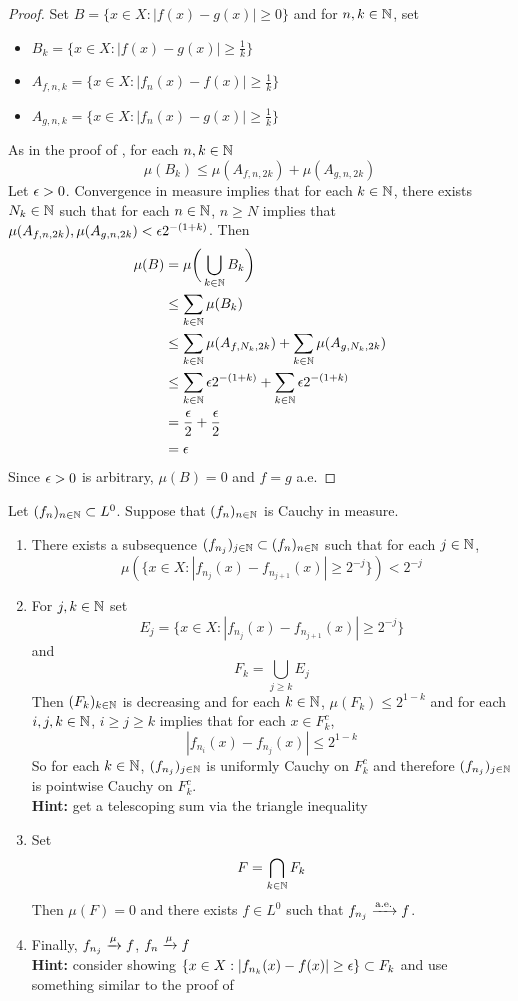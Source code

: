 \documentclass{book}
\begin{document}
	\begin{proof}
	Set $B = \{x \in X: |f(x) - g(x)|  \geq 0\}$ and for $n, k \in \mathbb{N}$, set 
	\begin{itemize}
	\item $B_k = \{x \in X: |f(x) - g(x)| \geq  \frac{1}{k}\}$
	\item $A_{f,n,k} = \{x \in X: |f_n(x) - f(x)| \geq  \frac{1}{k}\}$
	\item $A_{g,n,k} = \{x \in X: |f_n(x) - g(x)| \geq  \frac{1}{k}\}$
	\end{itemize} 
	As in the proof of , for each $n, k \in \mathbb{N}$
	$$\mu(B_k) \leq \mu(A_{f,n,2k}) + \mu(A_{g, n, 2k})$$ 
	Let $\epsilon >0$. Convergence in measure implies that for each $k \in \mathbb{N}$, there exists $N_k \in \mathbb{N}$ such that for each $n \in \mathbb{N}$, $n \geq N$ implies that $\mu(A_{f,n,2k}), \mu(A_{g,n,2k}) < \epsilon 2^{-(1+k)}$.
	Then 
	\begin{align*}
	\mu(B)
	&= \mu \bigg( \bigcup_{k \in \mathbb{N}} B_k \bigg) \\
	& \leq \sum\limits_{k \in \mathbb{N}} \mu(B_k) \\
	& \leq  \sum\limits_{k \in \mathbb{N}}\mu(A_{f,N_k,2k}) + \sum\limits_{k \in \mathbb{N}}\mu(A_{g, N_k, 2k}) \\
	&\leq  \sum\limits_{k \in \mathbb{N}} \epsilon 2^{-(1+k)} + \sum\limits_{k \in \mathbb{N}} \epsilon 2^{-(1+k)} \\
	&= \frac{\epsilon}{2} + \frac{\epsilon}{2} \\
	&= \epsilon
\end{align*}	 
	Since $\epsilon >0$ is arbitrary, $\mu(B) = 0$ and $f = g$ a.e.
	\end{proof}
	
	\begin{ex}  
		Let $(f_n)_{n \in \mathbb{N}} \subset L^0$. Suppose that $(f_n)_{n \in \mathbb{N}}$ is Cauchy in measure. 
		\begin{enumerate}
		\item There exists a subsequence $(f_{n_j})_{j \in \mathbb{N}} \subset (f_n)_{n \in \mathbb{N}}$ such that for each $j \in \mathbb{N}$, $$\mu(\{x \in X: |f_{n_j}(x) - f_{n_{j+1}}(x)| \geq 2^{-j}\}) < 2^{-j}$$
		\item For $j,k \in \mathbb{N}$ set 
		$$E_j = \{x \in X: |f_{n_j}(x) - f_{n_{j+1}}(x)| \geq 2^{-j}\}$$
		and 
		$$F_k = \bigcup_{j \geq k}E_j$$
		Then $(F_k)_{k \in \mathbb{N}}$ is decreasing and for each $k \in \mathbb{N}$, $\mu(F_k) \leq 2^{1-k}$ and for each $i, j, k \in \mathbb{N}$, $i \geq j \geq k$ implies that for each $x \in F_k^c$, $$|f_{n_i}(x) - f_{n_j}(x)| \leq 2^{1-k}$$ 
		So for each $k \in \mathbb{N}$, $(f_{n_j})_{j \in \mathbb{N}}$  is uniformly Cauchy on $F_k^c$ and therefore $(f_{n_j})_{j \in \mathbb{N}}$  is pointwise Cauchy on $F_k^c$. \\
		\textbf{Hint:} get a telescoping sum via the triangle inequality 
		\item Set $$F = \bigcap_{k \in \mathbb{N}} F_k$$ 
		Then $\mu(F) = 0$ and there exists $f \in L^0$ such that $f_{n_j} \xrightarrow{\text{a.e.}} f$.  
		\item Finally, $f_{n_j} \xrightarrow{\mu} f$, $f_n \xrightarrow{\mu} f$ \\
		\textbf{Hint:} consider showing $\{x \in X: |f_{n_k}(x) - f(x)| \geq \epsilon\} \subset F_k$ and use something similar to the proof of 
		\end{enumerate}  
	\end{ex}
	
\end{document}
